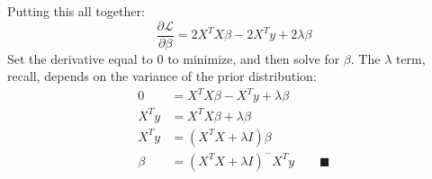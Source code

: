 \documentclass{article}
\begin{document}
	Putting this all together:
	\begin{equation*}
	\frac{\partial\mathcal{L}}{\partial\beta}=2X^TX\beta-2X^Ty+2\lambda\beta
	\end{equation*}
	Set the derivative equal to 0 to minimize, and then solve for $\beta$. The $\lambda$ term, recall, depends on the variance of the prior distribution:
	\begin{align*}
	0&=X^TX\beta-X^Ty+\lambda\beta\\
	X^Ty&=X^TX\beta+\lambda\beta\\
	X^Ty&=(X^TX+\lambda I)\beta\\
	\beta&=(X^TX+\lambda I)^-X^Ty
	\qquad\blacksquare
	\end{align*}
\end{document}
